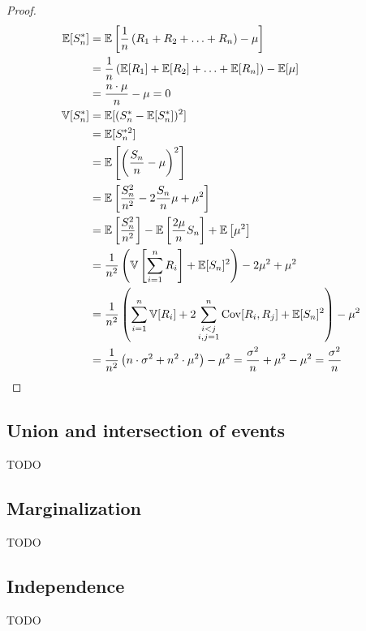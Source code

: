 
\begin{proof}
  \begin{align}
      \mathbb E[S^*_n] &= \mathbb E\left[\frac{1}{n}\left(R_1 + R_2 + \ldots + R_n\right) - \mu\right] \nonumber\\
                &= \frac1n \left(\mathbb E[R_1] + \mathbb E[R_2] + \ldots + \mathbb E[R_n]\right) - \mathbb E[\mu] \nonumber\\
                &= \frac{n \cdot \mu}{n} - \mu = 0 \\
    \mathbb V[S^*_n] &= \mathbb E[(S_n^* - \mathbb E[S_n^*])^2] \nonumber\\
                &= \mathbb E[S_n^{*2}] \nonumber\\
                &= \mathbb E\left[\left(\frac{S_n}{n} - \mu\right)^2\right] \nonumber\\
                &= \mathbb E\left[\frac{S_n^2}{n^2} - 2\frac{S_n}{n}\mu + \mu^2\right] \nonumber\\
                &= \mathbb E\left[\frac{S_n^2}{n^2}\right] - \mathbb E\left[\frac{2\mu}{n} S_n\right] + \mathbb E\left[\mu^2\right] \nonumber\\
                &= \frac{1}{n^2} \left(\mathbb V\left[\sum_{i=1}^n R_i\right] + \mathbb E[S_n]^2\right) - 2\mu^2 + \mu^2 \nonumber\\
                &= \frac{1}{n^2} \left(\sum_{i=1}^n \mathbb V[R_i] + 2\sum_{\substack{i<j \\ i,j=1}}^n \operatorname{Cov}[R_i,R_j] + \mathbb E[S_n]^2\right) - \mu^2 \nonumber\\
                &= \frac{1}{n^2} \left(n \cdot \sigma^2 + n^2 \cdot \mu^2\right) - \mu^2 = \frac{\sigma^2}{n} + \mu^2 - \mu^2 = \frac{\sigma^2}{n}
  \end{align}
\end{proof}

\subsection{Union and intersection of events}
\label{sec:bp-unin}
%
TODO

\subsection{Marginalization}
\label{sec:bp-marginalization}
%
TODO

\subsection{Independence}
\label{sec:bp-indep}
%
TODO

